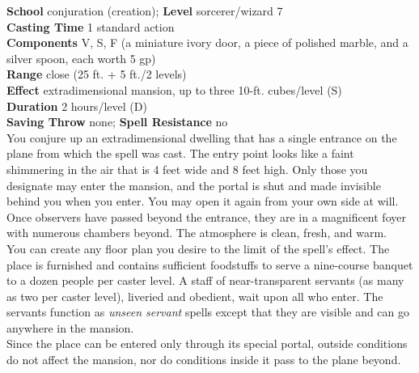 \textbf{School} conjuration (creation); \textbf{Level} sorcerer/wizard 7\\
\textbf{Casting Time} 1 standard action\\
\textbf{Components} V, S, F (a miniature ivory door, a piece of polished marble, and a silver spoon, each worth 5 gp)\\
\textbf{Range} close (25 ft. + 5 ft./2 levels)\\
\textbf{Effect} extradimensional mansion, up to three 10-ft. cubes/level (S)\\
\textbf{Duration} 2 hours/level (D)\\
\textbf{Saving Throw} none; \textbf{Spell Resistance} no\\
You conjure up an extradimensional dwelling that has a single entrance on the plane from which the spell was cast. The entry point looks like a faint shimmering in the air that is 4 feet wide and 8 feet high. Only those you designate may enter the mansion, and the portal is shut and made invisible behind you when you enter. You may open it again from your own side at will. Once observers have passed beyond the entrance, they are in a magnificent foyer with numerous chambers beyond. The atmosphere is clean, fresh, and warm.\\
You can create any floor plan you desire to the limit of the spell's effect. The place is furnished and contains sufficient foodstuffs to serve a nine-course banquet to a dozen people per caster level. A staff of near-transparent servants (as many as two per caster level), liveried and obedient, wait upon all who enter. The servants function as \textit{unseen servant }spells except that they are visible and can go anywhere in the mansion.\\
Since the place can be entered only through its special portal, outside conditions do not affect the mansion, nor do conditions inside it pass to the plane beyond.\\
